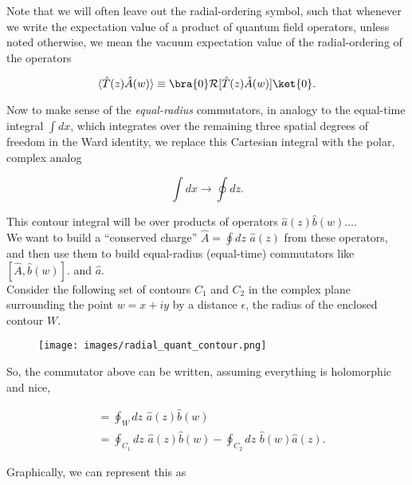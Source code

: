 \noindent Note that we will often leave out the radial-ordering symbol, such that whenever we write the expectation value of a product of quantum field operators, unless noted otherwise, we mean the vacuum expectation value of the radial-ordering of the operators

\begin{equation}
\langle \hat{T} (z) \hat{A} (w) \rangle \equiv \bra{0} \mathcal{R} [ \hat{T} (z) \hat{A} (w) ] \ket{0}.
\end{equation}

\noindent Now to make sense of the \textit{equal-radius} commutators, in analogy to the equal-time integral $\int dx$, which integrates over the remaining three spatial degrees of freedom in the Ward identity, we replace this Cartesian integral with the polar, complex analog

\begin{equation}
\int dx \rightarrow \oint dz.
\end{equation}

\noindent This contour integral will be over products of operators $\hat{a} (z) \hat{b} (w) \dots$. \\

\noindent We want to build a ``conserved charge'' $\hat{A} = \oint dz \,\, \hat{a} (z)$ from these operators, and then use them to build equal-radius (equal-time) commutators like $[\hat{A}, \hat{b} (w) ]$. and $\hat{a}$. \\

\noindent Consider the following set of contours $C_1$ and $C_2$ in the complex plane surrounding the point $w=x+iy$ by a distance $\epsilon$, the radius of the enclosed contour $W$.

\begin{figure}[H]
	\centering
	\texttt{[image: images/radial\_quant\_contour.png]} 
\end{figure} 

\noindent So, the commutator above can be written, assuming everything is holomorphic and nice,

\begin{align}
[ \hat{A}, \hat{b} (w)] &= \oint_W dz \,\, \hat{a} (z) \hat{b} (w) \\
&= \oint_{C_1} dz \,\, \hat{a} (z) \hat{b} (w) - \oint_{C_2} dz \,\, \hat{b} (w) \hat{a} (z).
\end{align}

\noindent Graphically, we can represent this as


